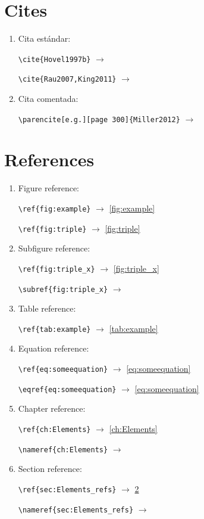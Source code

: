 \section{Cites}\label{sec:Elements_cites}
\begin{enumerate}
  \item Cita estándar:
  
  \verb=\cite{Hovel1997b}= $\rightarrow$  \cite{Hovel1997b}
  
  \verb=\cite{Rau2007,King2011}= $\rightarrow$  \cite{King2011,Rau2007}\\
  
  \item Cita comentada:
  
  \verb=\parencite[e.g.][page 300]{Miller2012}= $\rightarrow$ \parencite[e.g.][page 300]{Miller2012}
\end{enumerate}

\section{References}\label{sec:Elements_refs}

\begin{enumerate}
  \item Figure reference:
  
  \verb=\ref{fig:example}= $\rightarrow$ \ref{fig:example}
  
  \verb=\ref{fig:triple}= $\rightarrow$ \ref{fig:triple}\\
  
  \item Subfigure reference:
  
  \verb=\ref{fig:triple_x}= $\rightarrow$ \ref{fig:triple_x}
  
  \verb=\subref{fig:triple_x}= $\rightarrow$ \\
  
  \item Table reference:
  
  \verb=\ref{tab:example}= $\rightarrow$ \ref{tab:example}\\
  
  \item Equation reference:
  
  \verb=\ref{eq:someequation}= $\rightarrow$ \ref{eq:someequation}
  
  \verb=\eqref{eq:someequation}= $\rightarrow$ \eqref{eq:someequation}\\
  
  \item Chapter reference:
  
  \verb=\ref{ch:Elements}= $\rightarrow$ \ref{ch:Elements}
  
  \verb=\nameref{ch:Elements}= $\rightarrow$ \\
  
  \item Section reference:
  
  \verb=\ref{sec:Elements_refs}= $\rightarrow$ \ref{sec:Elements_refs}
  
  \verb=\nameref{sec:Elements_refs}= $\rightarrow$ \\
\end{enumerate}


